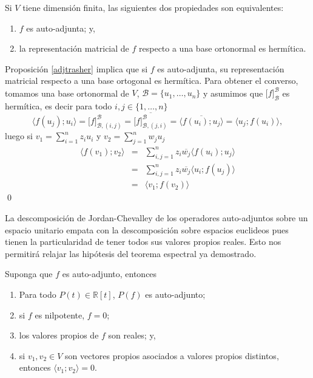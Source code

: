 \begin{prop}
Si $V$ tiene dimensi\'on finita, las siguientes dos propiedades son equivalentes:
\begin{enumerate}
\item $f$ es auto-adjunta; y,
\item la representaci\'on matricial de $f$ respecto a una base ortonormal es herm\'itica.
\end{enumerate}
\end{prop}

\dem Proposici\'on \ref{adjtrasher} implica que si $f$ es auto-adjunta, su representaci\'on matricial respecto a una base ortogonal es herm\'itica. Para obtener el converso, tomamos una base ortonormal de $V$, $\mathcal{B}=\{u_1,\ldots,u_n\}$ y asumimos que $\Big[f\Big]^\mathcal{B}_\mathcal{B}$ es herm\'itica, es decir para todo $i,j\in\{1,\ldots,n\}$
\[
\langle f(u_j);u_i \rangle= \Big[f\Big]^\mathcal{B}_{\mathcal{B},(i,j)}= \overline{\Big[f\Big]^\mathcal{B}_{\mathcal{B},(j,i)}}= \overline{\langle f(u_i);u_j \rangle}=\langle u_j;f(u_i) \rangle,
\]
luego si $v_1=\sum_{i=1}^{n}z_iu_i$ y $v_2=\sum_{j=1}^{n}w_ju_j$
\begin{eqnarray*}
\langle f(v_1);v_2 \rangle & = & \sum_{i,j=1}^nz_i\overline{w_j}\langle f(u_i);u_j\rangle\\
  & = & \sum_{i,j=1}^nz_i\overline{w_j}\langle u_i;f(u_j)\rangle\\
  & = & \langle v_1;f(v_2)\rangle
\end{eqnarray*}
\qed

\begin{obs}
La descomposici\'on de Jordan-Chevalley de los operadores auto-adjuntos sobre un espacio unitario empata con la descomposici\'on sobre espacios euclideos pues tienen la particularidad de tener todos sus valores propios reales. Esto nos permitir\'a relajar las hip\'otesis del teorema espectral ya demostrado. 
\end{obs}

\begin{lema} Suponga que $f$ es auto-adjunto, entonces
\begin{enumerate}
\item Para todo $P(t)\in\mathbb{R}[t]$, $P(f)$ es auto-adjunto;
\item si $f$ es nilpotente, $f=0$;
\item los valores propios de $f$ son reales; y,
\item si $v_1,v_2\in V$ son vectores propios asociados a valores propios distintos, entonces $\langle v_1;v_2\rangle=0$.
\end{enumerate}
\end{lema}


